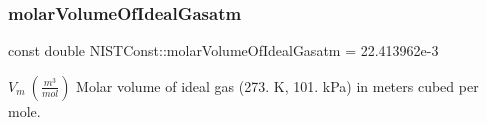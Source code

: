 \subsubsection{\texorpdfstring{molar\+Volume\+Of\+Ideal\+Gasatm}{molarVolumeOfIdealGasatm}}
{\footnotesize\ttfamily const double N\+I\+S\+T\+Const\+::molar\+Volume\+Of\+Ideal\+Gasatm = 22.\+413962e-\/3}

$V_m \ (\frac{m^3}{mol})$ Molar volume of ideal gas (273. K, 101. k\+Pa) in meters cubed per mole. 